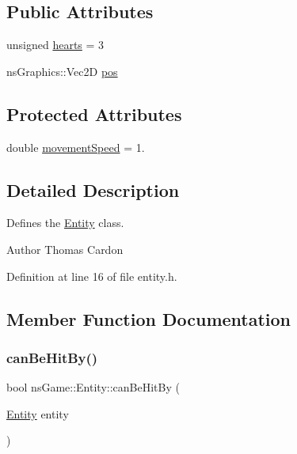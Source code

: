 \subsection*{Public Attributes}
\begin{DoxyCompactItemize}
\item 
unsigned \hyperlink{classns_game_1_1_entity_a1e6e0c4a54bb2ce22f2c5f2a646b08fe}{hearts} = 3
\item 
ns\+Graphics\+::\+Vec2D \hyperlink{classns_game_1_1_entity_a1ad359bb31e86c4971fd96b080ed43c4}{pos}
\end{DoxyCompactItemize}
\subsection*{Protected Attributes}
\begin{DoxyCompactItemize}
\item 
double \hyperlink{classns_game_1_1_entity_a2b5d83f01bdc1d58673b3fae9afe704e}{movement\+Speed} = 1.
\end{DoxyCompactItemize}


\subsection{Detailed Description}
Defines the \hyperlink{classns_game_1_1_entity}{Entity} class. 

\begin{DoxyAuthor}{Author}
Thomas Cardon 
\end{DoxyAuthor}


Definition at line 16 of file entity.\+h.



\subsection{Member Function Documentation}
\mbox{\label{classns_game_1_1_entity_a3e5ba5a1f5b7491dc79b3dbbe5f75701}} 
\subsubsection{\texorpdfstring{can\+Be\+Hit\+By()}{canBeHitBy()}}
{\footnotesize\ttfamily bool ns\+Game\+::\+Entity\+::can\+Be\+Hit\+By (\begin{DoxyParamCaption}\item[{\hyperlink{classns_game_1_1_entity}{Entity}}]{entity }\end{DoxyParamCaption})\hspace{0.3cm}{\ttfamily [virtual]}}



